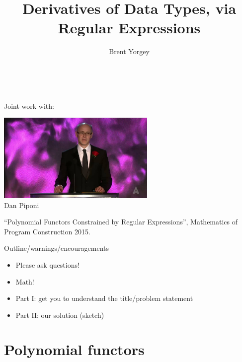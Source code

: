 \documentclass[xcolor=svgnames,12pt]{beamer}
\title{Derivatives of Data Types, via Regular Expressions}
\date{\theschool \\ \thedate}
\author{Brent Yorgey}
\newenvironment{xframe}[1][]
  {\begin{frame}[fragile,environment=xframe,#1]}
  {\end{frame}}
\begin{document}
\begin{xframe}{}
   \titlepage
\end{xframe}

\begin{xframe}
  \begin{center}
    Joint work with: \bigskip

    \includegraphics[width=3in]{dan} \\
    Dan Piponi \medskip

    ``Polynomial Functors Constrained by Regular Expressions'',
    Mathematics of Program Construction 2015.
  \end{center}
\end{xframe}

\begin{xframe}{Outline/warnings/encouragements}

\begin{itemize}
\item Please ask questions!
\item Math!
\item Part I: get you to understand the title/problem statement
\item Part II: our solution (sketch)
\end{itemize}


\end{xframe}

\section{Polynomial functors}
\end{document}
